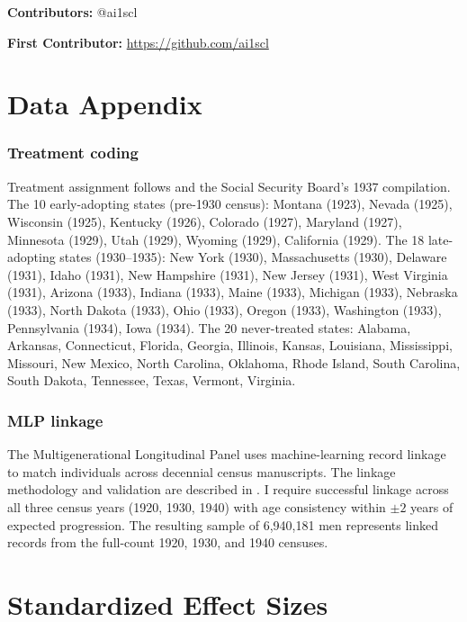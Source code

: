 \documentclass[12pt]{article}
\begin{document}
\noindent\textbf{Contributors:} @ai1scl

\noindent\textbf{First Contributor:} \url{https://github.com/ai1scl}

\label{apep_main_text_end}
\newpage


\newpage
\appendix

\section{Data Appendix}
\label{sec:data_app}

\subsubsection*{Treatment coding} Treatment assignment follows \citet{epstein1933} and the Social Security Board's 1937 compilation. The 10 early-adopting states (pre-1930 census): Montana (1923), Nevada (1925), Wisconsin (1925), Kentucky (1926), Colorado (1927), Maryland (1927), Minnesota (1929), Utah (1929), Wyoming (1929), California (1929). The 18 late-adopting states (1930--1935): New York (1930), Massachusetts (1930), Delaware (1931), Idaho (1931), New Hampshire (1931), New Jersey (1931), West Virginia (1931), Arizona (1933), Indiana (1933), Maine (1933), Michigan (1933), Nebraska (1933), North Dakota (1933), Ohio (1933), Oregon (1933), Washington (1933), Pennsylvania (1934), Iowa (1934). The 20 never-treated states: Alabama, Arkansas, Connecticut, Florida, Georgia, Illinois, Kansas, Louisiana, Mississippi, Missouri, New Mexico, North Carolina, Oklahoma, Rhode Island, South Carolina, South Dakota, Tennessee, Texas, Vermont, Virginia.

\subsubsection*{MLP linkage} The Multigenerational Longitudinal Panel uses machine-learning record linkage to match individuals across decennial census manuscripts. The linkage methodology and validation are described in \citet{abramitzky2021}. I require successful linkage across all three census years (1920, 1930, 1940) with age consistency within $\pm 2$ years of expected progression. The resulting sample of 6,940,181 men represents linked records from the full-count 1920, 1930, and 1940 censuses.

\section{Standardized Effect Sizes}
\label{sec:sde}


\end{document}
